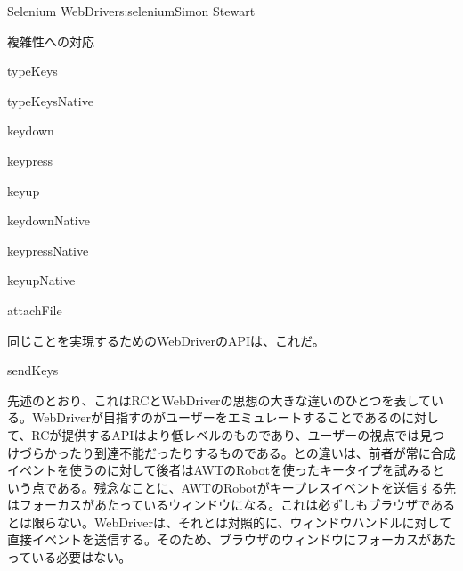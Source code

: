 \begin{aosachapter}{Selenium WebDriver}{s:selenium}{Simon Stewart}
\begin{aosasect1}{複雑性への対応}
\begin{aosaitemize}
\item typeKeys

\item typeKeysNative

\item keydown

\item keypress

\item keyup

\item keydownNative

\item keypressNative

\item keyupNative

\item attachFile

\end{aosaitemize}

同じことを実現するためのWebDriverのAPIは、これだ。

\begin{aosaitemize}

\item sendKeys

\end{aosaitemize}

先述のとおり、これはRCとWebDriverの思想の大きな違いのひとつを表している。WebDriverが目指すのがユーザーをエミュレートすることであるのに対して、RCが提供するAPIはより低レベルのものであり、ユーザーの視点では見つけづらかったり到達不能だったりするものである。との違いは、前者が常に合成イベントを使うのに対して後者はAWTのRobotを使ったキータイプを試みるという点である。残念なことに、AWTのRobotがキープレスイベントを送信する先はフォーカスがあたっているウィンドウになる。これは必ずしもブラウザであるとは限らない。WebDriverは、それとは対照的に、ウィンドウハンドルに対して直接イベントを送信する。そのため、ブラウザのウィンドウにフォーカスがあたっている必要はない。


\end{aosasect1}
\end{aosachapter}
